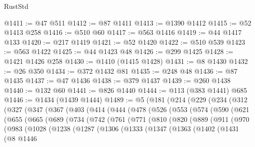 \begin{lexlean}{RustStd}
\begin{coremodule}
@1411 := @47 @511
@1412 := @87 @1411
@1413 := @1390 @1412
@1415 := @52 @1413 @258
@1416 := @510 @60
@1417 := @563 @1416
@1419 := @44 @1417 @133
@1420 := @217 @1419
@1421 := @52 @1420
@1422 := @510 @539
@1423 := @563 @1422
@1425 := @44 @1423 @48
@1426 := @299 @1425
@1428 := @1421 @1426 @258
@1430 := @1410 (@1415 @1428)
@1431 := @8 @1430
@1432 := @26 @350
@1434 := @372 @1432 @81
@1435 := @248 @48
@1436 := @87 @1435
@1437 := @47 @1436
@1438 := @379 @1437
@1439 := @260 @1438
@1440 := @132 @60
@1441 := @826 @1440
@1444 := @113 (@383 @1441) @685
@1446 := @1434 (@1439 @1444)
@1489 := @5
    (@181
      (@214
        (@229
          (@234
            (@312
              (@327
                (@347
                  (@367
                    (@403
                      (@414
                        (@444
                          (@478
                            (@526
                              (@553
                                (@574
                                  (@590
                                    (@621
                                      (@655
                                        (@665
                                          (@689
                                            (@734
                                              (@742
                                                (@761
                                                  (@771
                                                    (@810
                                                      (@820
                                                        (@889
                                                          (@911
                                                            (@970
                                                              (@983
                                                                (@1028
                                                                  (@1238
                                                                    (@1287
                                                                      (@1306
                                                                        (@1333
                                                                          (@1347
                                                                            (@1363
                                                                              (@1402
                                                                                (@1431
                                                                                  (@8
                                                                                    @1446

\end{coremodule}
\end{lexlean}
